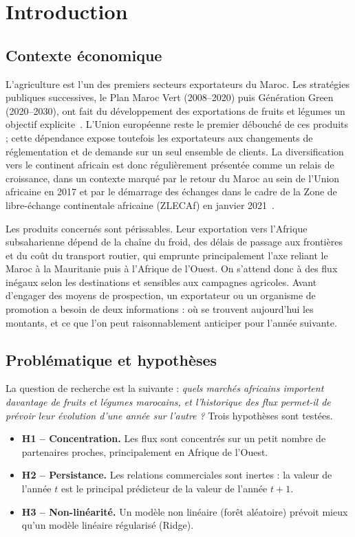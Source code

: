 \documentclass[11pt,a4paper]{article}
\begin{document}
\setcounter{tocdepth}{1}
\tableofcontents
\newpage

\section{Introduction}\label{sec:intro}
\subsection{Contexte économique}
L'agriculture est l'un des premiers secteurs exportateurs du Maroc. Les stratégies publiques successives, le Plan Maroc Vert (2008--2020) puis Génération Green (2020--2030), ont fait du développement des exportations de fruits et légumes un objectif explicite~\cite{agri}. L'Union européenne reste le premier débouché de ces produits ; cette dépendance expose toutefois les exportateurs aux changements de réglementation et de demande sur un seul ensemble de clients. La diversification vers le continent africain est donc régulièrement présentée comme un relais de croissance, dans un contexte marqué par le retour du Maroc au sein de l'Union africaine en 2017 et par le démarrage des échanges dans le cadre de la Zone de libre-échange continentale africaine (ZLECAf) en janvier 2021~\cite{zlecaf}.

Les produits concernés sont périssables. Leur exportation vers l'Afrique subsaharienne dépend de la chaîne du froid, des délais de passage aux frontières et du coût du transport routier, qui emprunte principalement l'axe reliant le Maroc à la Mauritanie puis à l'Afrique de l'Ouest. On s'attend donc à des flux inégaux selon les destinations et sensibles aux campagnes agricoles. Avant d'engager des moyens de prospection, un exportateur ou un organisme de promotion a besoin de deux informations : où se trouvent aujourd'hui les montants, et ce que l'on peut raisonnablement anticiper pour l'année suivante.

\subsection{Problématique et hypothèses}
La question de recherche est la suivante : \emph{quels marchés africains importent davantage de fruits et légumes marocains, et l'historique des flux permet-il de prévoir leur évolution d'une année sur l'autre ?} Trois hypothèses sont testées.
\begin{itemize}
\item \textbf{H1 -- Concentration.} Les flux sont concentrés sur un petit nombre de partenaires proches, principalement en Afrique de l'Ouest.
\item \textbf{H2 -- Persistance.} Les relations commerciales sont inertes : la valeur de l'année $t$ est le principal prédicteur de la valeur de l'année $t+1$.
\item \textbf{H3 -- Non-linéarité.} Un modèle non linéaire (forêt aléatoire) prévoit mieux qu'un modèle linéaire régularisé (Ridge).
\end{itemize}
\end{document}
